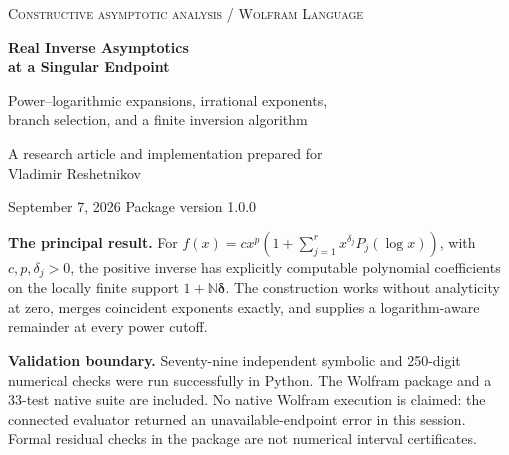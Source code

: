 \documentclass[11pt,a4paper]{article}
\numberwithin{equation}{section}
\theoremstyle{definition}
\newcommand{\N}{\mathbb N}
\newcommand{\del}{\boldsymbol\delta}
\begin{document}
\hypersetup{pageanchor=false}
\begin{titlepage}
\vspace*{12mm}
\noindent\textsc{Constructive asymptotic analysis \quad / \quad Wolfram Language}
\vspace{18mm}
\begin{flushleft}
{\Huge\bfseries Real Inverse Asymptotics\\[4pt]at a Singular Endpoint}\par
\vspace{8mm}
{\Large Power--logarithmic expansions, irrational exponents,\\
branch selection, and a finite inversion algorithm}\par
\vspace{15mm}
{\large A research article and implementation prepared for\\
Vladimir Reshetnikov}\par
\vspace{5mm}
{\large September 7, 2026 \quad\textbullet\quad Package version 1.0.0}
\end{flushleft}
\vfill
\noindent\begin{minipage}{0.94\textwidth}
\textbf{The principal result.}
For $f(x)=c x^p(1+\sum_{j=1}^r x^{\delta_j}P_j(\log x))$, with
$c,p,\delta_j>0$, the positive inverse has explicitly computable polynomial
coefficients on the locally finite support $1+\N\del$. The construction
works without analyticity at zero, merges coincident exponents exactly,
and supplies a logarithm-aware remainder at every power cutoff.

\medskip
\textbf{Validation boundary.}
Seventy-nine independent symbolic and 250-digit numerical checks were run
successfully in Python. The Wolfram package and a 33-test native suite are
included. No native Wolfram execution is claimed: the connected evaluator
returned an unavailable-endpoint error in this session. Formal residual
checks in the package are not numerical interval certificates.
\end{minipage}
\end{titlepage}
\hypersetup{pageanchor=true}
\end{document}
